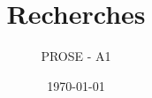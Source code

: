 \documentclass[paper=a4,fontsize=11pt]{scrartcl}
\title{Recherches}
\author{PROSE - A1}
\date{\today}
\begin{document}



\renewcommand{\contentsname}{Sommaire}
\tableofcontents %
\newpage
\listoffigures %
\listoftables %











\end{document}
